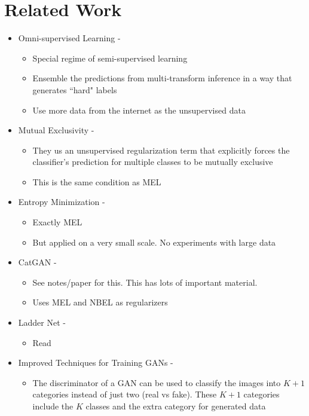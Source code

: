 \section{Related Work}

\begin{itemize}
	\item Omni-supervised Learning - \cite{Radosavovic2017}
	\begin{itemize}
		\item Special regime of semi-supervised learning
		\item Ensemble the predictions from multi-transform inference in  a way that generates ``hard"
			labels
		\item Use more data from the internet as the unsupervised data
	\end{itemize}

	\item Mutual Exclusivity - \cite{Sajjadi2016}
	\begin{itemize}
		\item They us an unsupervised regularization term that explicitly forces the classifier's
			prediction for multiple classes to be mutually exclusive 
		\item This is the same condition as MEL 
	\end{itemize}
	
	\item Entropy Minimization - \cite{Grandvalet2005}
	\begin{itemize}
		\item Exactly MEL
		\item But applied on a very small scale. No experiments with large data
	\end{itemize}
	
	\item CatGAN - \cite{Springenberg2015}
	\begin{itemize}
		\item See notes/paper for this. This has lots of important material.  
		\item Uses MEL and NBEL as regularizers
	\end{itemize}
	
	\item Ladder Net - \cite{Rasmus2015}
	\begin{itemize}
		\item Read
	\end{itemize}
	
	\item Improved Techniques for Training GANs - \cite{Salimans2016}
	\begin{itemize}
		\item The discriminator of a GAN can be used to classify the images into $K+1$ categories
			instead of just two (real vs fake). These $K+1$ categories include the $K$ classes and the
			extra category for generated data
	\end{itemize}
	

\end{itemize}
